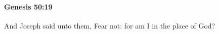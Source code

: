 
		\paragraph{Genesis 50:19} %
			\label{GENESIS-50-19}

			And Joseph said unto them, Fear not: for am I in the place of God?


